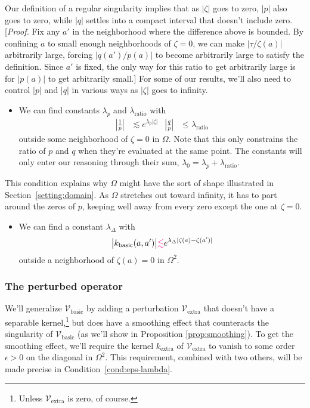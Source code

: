 \documentclass{article}
\makeatletter
\theoremstyle{plain}
\newcommand{\condconst}[2]{\item[($\text{\textsc{#1}} \mid #2$)]\protected@edef\@currentlabel{$\text{\textsc{#1}} \mid #2$}}
\newcommand{\hardpart}{\mathcal{V}_\text{basic}}
\newcommand{\softpart}{\mathcal{V}_\text{extra}}
\newcommand{\hardker}{k_\text{basic}}
\newcommand{\softker}{k_\text{extra}}
\newcommand{\domain}{\Omega}
\newenvironment{verify}{\color{ForestGreen}}{\color{black}}
\makeatother
\begin{document}
Our definition of a regular singularity implies that as $|\zeta|$ goes to zero, $|p|$ also goes to zero, while $|q|$ settles into a compact interval that doesn't include zero.
\begin{verify}
[\textit{Proof.} Fix any $a'$ in the neighborhood where the difference above is bounded. By confining $a$ to small enough neighborhoods of $\zeta = 0$, we can make $|\tau/\zeta(a)|$ arbitrarily large, forcing $|q(a')/p(a)|$ to become arbitrarily large to satisfy the definition. Since $a'$ is fixed, the only way for this ratio to get arbitrarily large is for $|p(a)|$ to get arbitrarily small.]
\end{verify}
For some of our results, we'll also need to control $|p|$ and $|q|$ in various ways as $|\zeta|$ goes to infinity.
\begin{itemize}
\condconst{slow}{\lambda_0}\label{cond:slow} We can find constants $\lambda_p$ and $\lambda_\text{ratio}$ with
\begin{align*}
\left|\frac{1}{p}\right| & \lesssim e^{\lambda_p |\zeta|} &
\left|\frac{q}{p}\right| & \le \lambda_\text{ratio}
\end{align*}
outside some neighborhood of $\zeta = 0$ in $\Omega$. Note that this only constrains the ratio of $p$ and $q$ when they're evaluated at the same point. The constants will only enter our reasoning through their sum, $\lambda_0 = \lambda_p + \lambda_\text{ratio}$.
\end{itemize}
This condition explains why $\domain$ might have the sort of shape illustrated in Section~\ref{setting:domain}. As $\domain$ stretches out toward infinity, it has to part around the zeros of $p$, keeping well away from every zero except the one at $\zeta = 0$.
\begin{itemize}
\condconst{diag$_0$}{\lambda_\Delta}\label{cond:diag-basic} We can find a constant $\lambda_\Delta$ with
\[ \big| \hardker(a, a') \big| \textcolor{magenta}{\lesssim} e^{\lambda_\Delta|\zeta(a)-\zeta(a')|} \]
outside a neighborhood of $\zeta(a) = 0$ in $\domain^2$.
\end{itemize}
\subsubsection{The perturbed operator}\label{setting:perturbed}
We'll generalize $\hardpart$ by adding a perturbation $\softpart$ that doesn't have a separable kernel,\footnote{Unless $\softpart$ is zero, of course.} but does have a smoothing effect that counteracts the singularity of $\hardpart$ (as we'll show in Proposition \ref{prop:smoothing}). To get the smoothing effect, we'll require the kernel $\softker$ of $\softpart$ to vanish to some order $\epsilon > 0$ on the diagonal in $\Omega^2$. This requirement, combined with two others, will be made precise in Condition~\eqref{cond:eps-lambda}.
\end{document}
